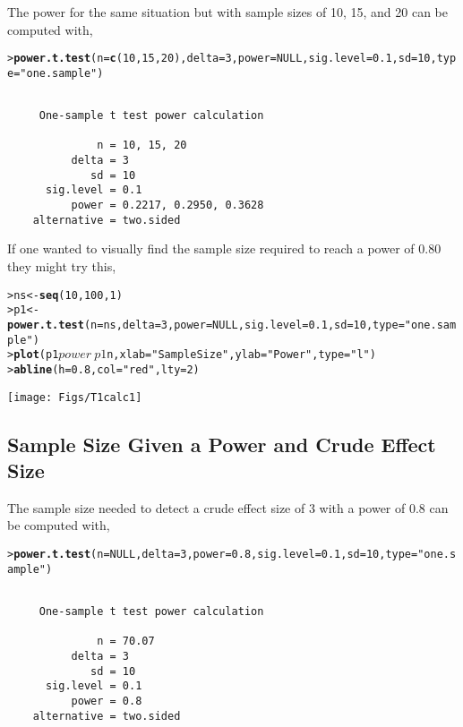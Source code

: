 \documentclass{article}\usepackage{graphicx, color}
\makeatletter
\newcommand{\hlfunctioncall}[1]{\textcolor[rgb]{0.501960784313725,0,0.329411764705882}{\textbf{#1}}}%
\newcommand{\hlstring}[1]{\textcolor[rgb]{0.6,0.6,1}{#1}}%
\newenvironment{kframe}{%
 \def\at@end@of@kframe{}%
 \ifinner\ifhmode%
  \def\at@end@of@kframe{\end{minipage}}%
  \begin{minipage}{\columnwidth}%
 \fi\fi%
 \def\FrameCommand##1{\hskip\@totalleftmargin \hskip-\fboxsep
 \colorbox{shadecolor}{##1}\hskip-\fboxsep
     \hskip-\linewidth \hskip-\@totalleftmargin \hskip\columnwidth}%
 \MakeFramed {\advance\hsize-\width
   \@totalleftmargin\z@ \linewidth\hsize
   \@setminipage}}%
 {\par\unskip\endMakeFramed%
 \at@end@of@kframe}
\newenvironment{knitrout}{}{} %
\makeatother
\begin{document}
The power for the same situation but with sample sizes of 10, 15, and 20 can be computed with,
\begin{knitrout}
\color{fgcolor}\begin{kframe}
\begin{alltt}
> \hlfunctioncall{power.t.test}(n=\hlfunctioncall{c}(10,15,20),delta=3,power=NULL,sig.level=0.1,sd=10,type=\hlstring{"one.sample"})
\end{alltt}
\begin{verbatim}

     One-sample t test power calculation 

              n = 10, 15, 20
          delta = 3
             sd = 10
      sig.level = 0.1
          power = 0.2217, 0.2950, 0.3628
    alternative = two.sided
\end{verbatim}
\end{kframe}
\end{knitrout}


If one wanted to visually find the sample size required to reach a power of 0.80 they might try this,
\begin{knitrout}
\color{fgcolor}\begin{kframe}
\begin{alltt}
> ns <- \hlfunctioncall{seq}(10,100,1)
> p1 <- \hlfunctioncall{power.t.test}(n=ns,delta=3,power=NULL,sig.level=0.1,sd=10,type=\hlstring{"one.sample"})
> \hlfunctioncall{plot}(p1$power~p1$n,xlab=\hlstring{"Sample Size"},ylab=\hlstring{"Power"},type=\hlstring{"l"})
> \hlfunctioncall{abline}(h=0.8,col=\hlstring{"red"},lty=2)
\end{alltt}
\end{kframe}

{\centering \texttt{[image: Figs/T1calc1]} 

}



\end{knitrout}


\subsection{Sample Size Given a Power and Crude Effect Size}
The sample size needed to detect a crude effect size of 3 with a power of 0.8 can be computed with,
\begin{knitrout}
\color{fgcolor}\begin{kframe}
\begin{alltt}
> \hlfunctioncall{power.t.test}(n=NULL,delta=3,power=0.8,sig.level=0.1,sd=10,type=\hlstring{"one.sample"})
\end{alltt}
\begin{verbatim}

     One-sample t test power calculation 

              n = 70.07
          delta = 3
             sd = 10
      sig.level = 0.1
          power = 0.8
    alternative = two.sided
\end{verbatim}
\end{kframe}
\end{knitrout}
\end{document}
